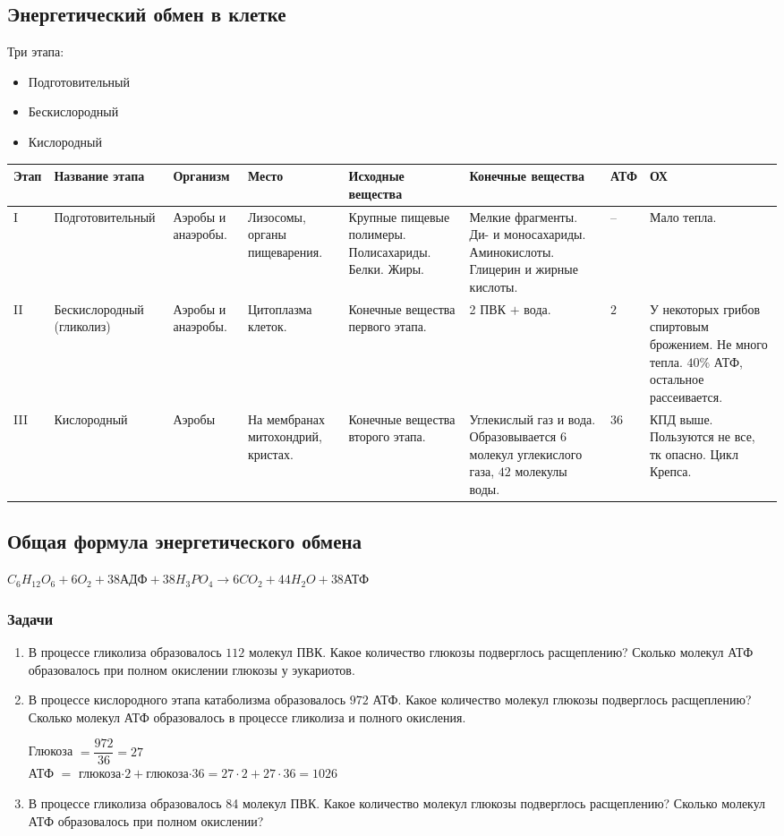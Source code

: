 \documentclass[12pt]{article}
\begin{document}
	\subsection{Энергетический обмен в клетке}
	Три этапа:
	\begin{itemize}
		\item Подготовительный
		\item Бескислородный
		\item Кислородный
	\end{itemize}
	\begin{xltabular}{\textwidth}{|m{1cm}|m{3.5cm}|m{1.8cm}|m{2.2cm}|X|X|m{1cm}|X|}
		\hline
		Этап & Название этапа & Организм & Место & Исходные вещества & Конечные вещества & АТФ & ОХ\\
		\hline
		I & Подготовительный & Аэробы и анаэробы. & Лизосомы, органы пищеварения. & Крупные пищевые полимеры. Полисахариды. Белки. Жиры. & Мелкие фрагменты. Ди- и моносахариды. Аминокислоты. Глицерин и жирные кислоты. & -- & Мало тепла.\\
		\hline
		II & Бескислородный (гликолиз) & Аэробы и анаэробы. & Цитоплазма клеток. & Конечные вещества первого этапа. & 2 ПВК $+$ вода. & $2$ & У некоторых грибов спиртовым брожением. Не много тепла. $40\%$ АТФ, остальное рассеивается.\\
		\hline
		III & Кислородный & Аэробы & На мембранах митохондрий, кристах. & Конечные вещества второго этапа. & Углекислый газ и вода. Образовывается $6$ молекул углекислого газа, $42$ молекулы воды. & $36$ & КПД выше. Пользуются не все, тк опасно. Цикл Крепса.\\
		\hline
	\end{xltabular}
	\subsection{Общая формула энергетического обмена}
	$C_6H_{12}O_6 + 6O_2 + 38\text{АДФ} + 38H_3PO_4 \rightarrow 6CO_2 + 44H_2O + 38\text{АТФ}$
	\subsubsection{Задачи}
	\begin{enumerate}
		\item В процессе гликолиза образовалось $112$ молекул ПВК. Какое количество глюкозы подверглось расщеплению? Сколько молекул АТФ образовалось при полном окислении глюкозы у эукариотов.
		\item В процессе кислородного этапа катаболизма образовалось $972$ АТФ. Какое количество молекул глюкозы подверглось расщеплению? Сколько молекул АТФ образовалось в процессе гликолиза и полного окисления.
		\begin{solution}
			Глюкоза $= \dfrac{972}{36} = 27$\\
			АТФ $=$ глюкоза$\cdot 2 +$глюкоза$\cdot 36 = 27 \cdot 2 + 27 \cdot 36 = 1026$
		\end{solution}
		\item В процессе гликолиза образовалось 84 молекул ПВК. Какое количество молекул глюкозы подверглось расщеплению? Сколько молекул АТФ образовалось при полном окислении?
	\end{enumerate}
\end{document}
